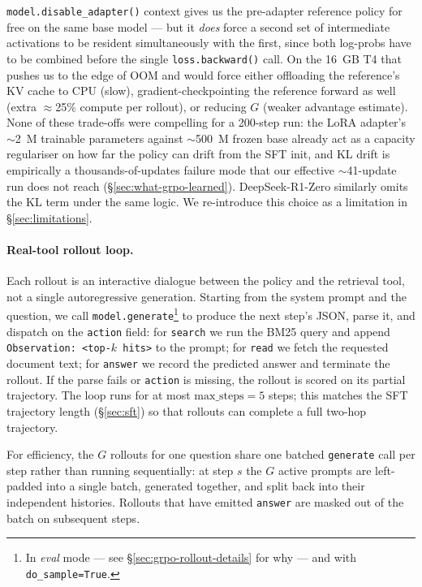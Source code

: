 \documentclass[11pt]{article}
\begin{document}
\texttt{model.disable\_adapter()} context gives us the pre-adapter
reference policy for free on the same base model --- but it
\emph{does} force a second set of intermediate activations to be
resident simultaneously with the first, since both log-probs have
to be combined before the single \texttt{loss.backward()} call. On
the 16~GB T4 that pushes us to the edge of OOM and would force
either offloading the reference's KV cache to CPU (slow),
gradient-checkpointing the reference forward as well (extra
$\approx$25\% compute per rollout), or reducing $G$ (weaker
advantage estimate). None of these trade-offs were compelling for
a 200-step run: the LoRA adapter's $\sim$2~M trainable parameters
against $\sim$500~M frozen base already act as a capacity
regulariser on how far the policy can drift from the SFT init, and
KL drift is empirically a thousands-of-updates failure mode that
our effective $\sim$41-update run does not reach
(§\ref{sec:what-grpo-learned}). DeepSeek-R1-Zero similarly omits
the KL term under the same logic. We re-introduce this choice as a
limitation in §\ref{sec:limitations}.

\paragraph{Real-tool rollout loop.}
Each rollout is an interactive dialogue between the policy and the
retrieval tool, not a single autoregressive generation. Starting from
the system prompt and the question, we call
\texttt{model.generate}\footnote{In \emph{eval} mode --- see
§\ref{sec:grpo-rollout-details} for why --- and with \texttt{do\_sample=True}.}
to produce the next step's JSON, parse it, and dispatch on the
\texttt{action} field: for \texttt{search} we run the BM25 query and
append \texttt{Observation: <top-$k$ hits>} to the prompt; for
\texttt{read} we fetch the requested document text; for \texttt{answer}
we record the predicted answer and terminate the rollout. If the parse
fails or \texttt{action} is missing, the rollout is scored on its
partial trajectory. The loop runs for at most $\mathrm{max\_steps}{=}5$
steps; this matches the SFT trajectory length (§\ref{sec:sft}) so that
rollouts can complete a full two-hop trajectory.

For efficiency, the $G$ rollouts for one question share one batched
\texttt{generate} call per step rather than running sequentially: at
step $s$ the $G$ active prompts are left-padded into a single batch,
generated together, and split back into their independent histories.
Rollouts that have emitted \texttt{answer} are masked out of the batch
on subsequent steps.
\end{document}
